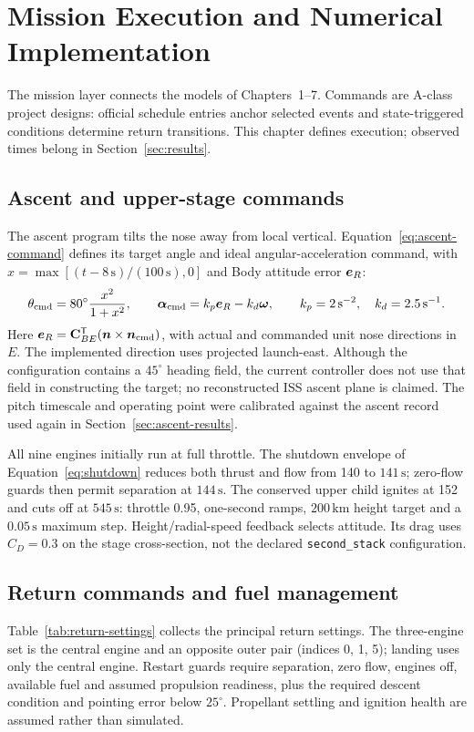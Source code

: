 \section{Mission Execution and Numerical Implementation}
\label{sec:mission-exec}

The mission layer connects the models of Chapters~1--7. Commands are A-class project designs: official schedule entries anchor selected events and state-triggered conditions determine return transitions. This chapter defines execution; observed times belong in Section~\ref{sec:results}.

\subsection{Ascent and upper-stage commands}
The ascent program tilts the nose away from local vertical. Equation~\eqref{eq:ascent-command} defines its target angle and ideal angular-acceleration command, with $x=\max[(t-8\,\mathrm{s})/(100\,\mathrm{s}),0]$ and Body attitude error $\boldsymbol{e}_R$:
\begin{equation}
 \theta_{\mathrm{cmd}}=80^\circ\frac{x^2}{1+x^2},\qquad
 \boldsymbol{\alpha}_{\mathrm{cmd}}=k_p\boldsymbol{e}_R-k_d\boldsymbol{\omega},\qquad
 k_p=2\,\mathrm{s^{-2}},\quad k_d=2.5\,\mathrm{s^{-1}}.
\label{eq:ascent-command}
\end{equation}
Here $\boldsymbol{e}_R=\mathbf{C}_{BE}^{\mathsf T}(\boldsymbol{n}\times\boldsymbol{n}_{\mathrm{cmd}})$, with actual and commanded unit nose directions in $E$. The implemented direction uses projected launch-east. Although the configuration contains a $45^\circ$ heading field, the current controller does not use that field in constructing the target; no reconstructed ISS ascent plane is claimed. The pitch timescale and operating point were calibrated against the ascent record used again in Section~\ref{sec:ascent-results}.

All nine engines initially run at full throttle. The shutdown envelope of Equation~\eqref{eq:shutdown} reduces both thrust and flow from 140 to $141\,\mathrm{s}$; zero-flow guards then permit separation at $144\,\mathrm{s}$. The conserved upper child ignites at 152 and cuts off at $545\,\mathrm{s}$: throttle 0.95, one-second ramps, $200\,\mathrm{km}$ height target and a $0.05\,\mathrm{s}$ maximum step. Height/radial-speed feedback selects attitude. Its drag uses $C_D=0.3$ on the stage cross-section, not the declared \texttt{second\_stack} configuration.

\subsection{Return commands and fuel management}
Table~\ref{tab:return-settings} collects the principal return settings. The three-engine set is the central engine and an opposite outer pair (indices 0, 1, 5); landing uses only the central engine. Restart guards require separation, zero flow, engines off, available fuel and assumed propulsion readiness, plus the required descent condition and pointing error below $25^\circ$. Propellant settling and ignition health are assumed rather than simulated.

